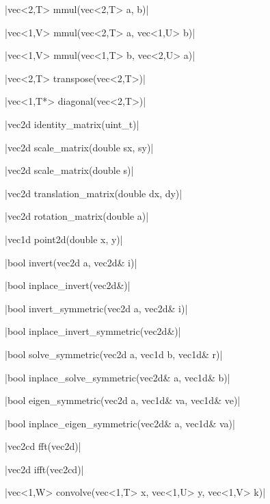 \funcitem \cppinline|vec<2,T> mmul(vec<2,T> a, b)| 

\cppinline|vec<1,V> mmul(vec<2,T> a, vec<1,U> b)|

\cppinline|vec<1,V> mmul(vec<1,T> b, vec<2,U> a)|

\funcitem \cppinline|vec<2,T> transpose(vec<2,T>)| 

\funcitem \cppinline|vec<1,T*> diagonal(vec<2,T>)| 

\funcitem \cppinline|vec2d identity_matrix(uint_t)| 

\funcitem \cppinline|vec2d scale_matrix(double sx, sy)| 

\cppinline|vec2d scale_matrix(double s)|

\funcitem \cppinline|vec2d translation_matrix(double dx, dy)| 

\funcitem \cppinline|vec2d rotation_matrix(double a)| 

\funcitem \cppinline|vec1d point2d(double x, y)| 

\item \lapack \cppinline|bool invert(vec2d a, vec2d& i)| 

\lapack \cppinline|bool inplace_invert(vec2d&)| 

\item \lapack \cppinline|bool invert_symmetric(vec2d a, vec2d& i)| 

\lapack \cppinline|bool inplace_invert_symmetric(vec2d&)| 

\item \lapack \cppinline|bool solve_symmetric(vec2d a, vec1d b, vec1d& r)| 

\lapack \cppinline|bool inplace_solve_symmetric(vec2d& a, vec1d& b)| 

\item \lapack \cppinline|bool eigen_symmetric(vec2d a, vec1d& va, vec1d& ve)| 

\lapack \cppinline|bool inplace_eigen_symmetric(vec2d& a, vec1d& va)| 

\item \fftw \cppinline|vec2cd fft(vec2d)| 

\fftw \cppinline|vec2d ifft(vec2cd)| 

\funcitem \cppinline|vec<1,W> convolve(vec<1,T> x, vec<1,U> y, vec<1,V> k)| 
